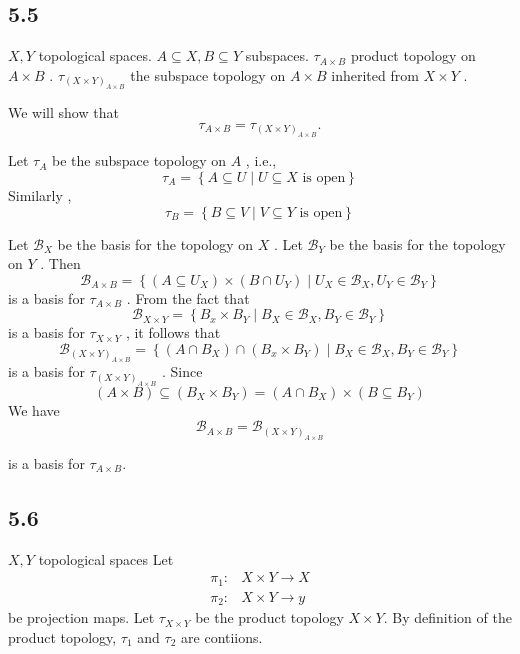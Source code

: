 \documentclass{article}
\theoremstyle{remark}
\newcommand{\newpara}
    {
    \vskip 0.4cm
    }
\begin{document}
\subsection*{5.5}%
\label{sub:5_5}

$X,Y$ topological spaces. $A \subseteq  X, B \subseteq Y$  subspaces. $\tau _{A \times B}$  product topology on $A
\times B$ . $\tau _{\left( X \times Y \right)_{A \times  B}}$  the subspace topology on $A \times  B$  inherited from $X
\times  Y$ .
\newpara
We will show that \[
\tau _{A \times  B} = \tau _{\left( X \times Y \right)_{A \times B}}.
\]

Let $\tau _{A}$ be the subspace topology on $A$ , i.e., \[
\tau _{A} = \left\{ A \subseteq  U  \mid  U \subseteq  X \text{ is open} \right\}
\]
Similarly , \[
\tau _{B} = \left\{ B \subseteq  V  \mid  V \subseteq Y \text{ is open} \right\}
\]

Let $\mathscr{B} _{X}$ be the basis for the topology on $X$ . Let $\mathscr{B} _{Y}$ be the basis for the topology on
$Y$ .  Then \[
\mathscr{B}_{A \times B} = \left\{ \left( A \subseteq U _{X} \right) \times \left( B \cap U_{Y} \right)  \mid  U_{X} \in
\mathscr{B} _{X}, U_{Y} \in  \mathscr{B}  _{Y}\right\}
\] is a basis for $\tau _{A \times  B}$ . From the fact that \[
\mathscr{B}  _{X \times Y} = \left\{ B_{x} \times  B_{Y}  \mid  B_{X} \in  \mathscr{B} _{X}, B_{Y} \in \mathscr{B} _{Y} \right\}
\]
is a basis for $\tau _{X \times Y}$ , it follows that \[
\mathscr{B} _{\left( X \times Y \right)_{A \times B}} = \left\{ \left( A \cap B_{X} \right) \cap \left( B_{x} \times
B_{Y} \right)  \mid  B_{X} \in \mathscr{B} _{X} , B_{Y} \in \mathscr{B} _{Y} \right\}
\]
is a basis for $\tau _{\left( X \times Y \right)_{A \times B}}$ . Since \[
\left( A \times B \right) \subseteq \left( B_{X} \times  B_{Y} \right) = \left( A \cap B_{X}  \right) \times  \left( B
\subseteq B_{Y} \right)
\]
We have \[
    \mathscr{B} _{A\times B} = \mathscr{B} _{\left( X \times Y \right)_{A \times B}}
\]

is a basis for $\tau _{A  \times B}$.

\subsection*{5.6}%
\label{sub:5_6}

$X,Y$  topological spaces  Let \[
    \begin{split}
\pi _{1}:&  X \times Y \to X \\
\pi _{2} : &  X \times Y \to y
    \end{split}
\]
be projection maps. Let $\tau _{X \times Y}$ be the product topology $X \times Y$. By definition of the product
topology, $\tau _{1}$  and $\tau _{2}$  are contiions.
\end{document}
